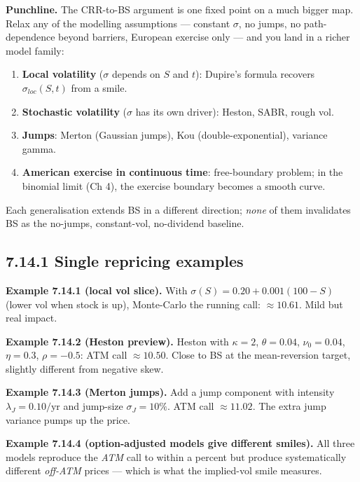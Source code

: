 \documentclass[
  10pt,
  twoside]{book}
\newcounter{none} %
\providecommand{\tightlist}{%
  \setlength{\itemsep}{0pt}\setlength{\parskip}{0pt}}
\begin{document}
\textbf{Punchline.} The CRR-to-BS argument is one fixed point on a much
bigger map. Relax any of the modelling assumptions --- constant
\(\sigma\), no jumps, no path-dependence beyond barriers, European
exercise only --- and you land in a richer model family:

\begin{enumerate}
\def\labelenumi{\arabic{enumi}.}
\tightlist
\item
  \textbf{Local volatility} (\(\sigma\) depends on \(S\) and \(t\)):
  Dupire's formula recovers \(\sigma_{loc}(S, t)\) from a smile.
\item
  \textbf{Stochastic volatility} (\(\sigma\) has its own driver):
  Heston, SABR, rough vol.
\item
  \textbf{Jumps}: Merton (Gaussian jumps), Kou (double-exponential),
  variance gamma.
\item
  \textbf{American exercise in continuous time}: free-boundary problem;
  in the binomial limit (Ch 4), the exercise boundary becomes a smooth
  curve.
\end{enumerate}

Each generalisation extends BS in a different direction; \emph{none} of
them invalidates BS as the no-jumps, constant-vol, no-dividend baseline.

\subsection{7.14.1 Single repricing
examples}\label{single-repricing-examples}

\textbf{Example 7.14.1 (local vol slice).} With
\(\sigma(S) = 0.20 + 0.001(100 - S)\) (lower vol when stock is up),
Monte-Carlo the running call: \(\approx 10.61\). Mild but real impact.

\textbf{Example 7.14.2 (Heston preview).} Heston with \(\kappa = 2\),
\(\theta = 0.04\), \(\nu_0 = 0.04\), \(\eta = 0.3\), \(\rho = -0.5\):
ATM call \(\approx 10.50\). Close to BS at the mean-reversion target,
slightly different from negative skew.

\textbf{Example 7.14.3 (Merton jumps).} Add a jump component with
intensity \(\lambda_J = 0.10/\text{yr}\) and jump-size
\(\sigma_J = 10\%\). ATM call \(\approx 11.02\). The extra jump variance
pumps up the price.

\textbf{Example 7.14.4 (option-adjusted models give different smiles).}
All three models reproduce the \emph{ATM} call to within a percent but
produce systematically different \emph{off-ATM} prices --- which is what
the implied-vol smile measures.
\end{document}
